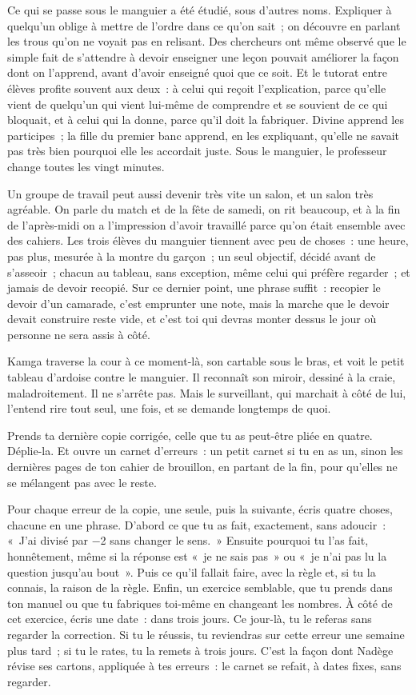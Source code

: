 \documentclass[10.5pt,twoside,openright]{book}
\newcommand{\soustitre}[1]{\par\vspace{1.1em}\noindent{\bfseries\color{accent}#1}\par\vspace{0.4em}\noindent}
\begin{document}
Ce qui se passe sous le manguier a été étudié, sous d’autres noms. Expliquer à quelqu’un oblige à mettre de l’ordre dans ce qu’on sait ; on découvre en parlant les trous qu’on ne voyait pas en relisant. Des chercheurs ont même observé que le simple fait de s’attendre à devoir enseigner une leçon pouvait améliorer la façon dont on l’apprend, avant d’avoir enseigné quoi que ce soit. Et le tutorat entre élèves profite souvent aux deux : à celui qui reçoit l’explication, parce qu’elle vient de quelqu’un qui vient lui-même de comprendre et se souvient de ce qui bloquait, et à celui qui la donne, parce qu’il doit la fabriquer. Divine apprend les participes ; la fille du premier banc apprend, en les expliquant, qu’elle ne savait pas très bien pourquoi elle les accordait juste. Sous le manguier, le professeur change toutes les vingt minutes.

Un groupe de travail peut aussi devenir très vite un salon, et un salon très agréable. On parle du match et de la fête de samedi, on rit beaucoup, et à la fin de l’après-midi on a l’impression d’avoir travaillé parce qu’on était ensemble avec des cahiers. Les trois élèves du manguier tiennent avec peu de choses : une heure, pas plus, mesurée à la montre du garçon ; un seul objectif, décidé avant de s’asseoir ; chacun au tableau, sans exception, même celui qui préfère regarder ; et jamais de devoir recopié. Sur ce dernier point, une phrase suffit : recopier le devoir d’un camarade, c’est emprunter une note, mais la marche que le devoir devait construire reste vide, et c’est toi qui devras monter dessus le jour où personne ne sera assis à côté.

Kamga traverse la cour à ce moment-là, son cartable sous le bras, et voit le petit tableau d’ardoise contre le manguier. Il reconnaît son miroir, dessiné à la craie, maladroitement. Il ne s’arrête pas. Mais le surveillant, qui marchait à côté de lui, l’entend rire tout seul, une fois, et se demande longtemps de quoi.

\soustitre{Ce soir, essaie ceci}

Prends ta dernière copie corrigée, celle que tu as peut-être pliée en quatre. Déplie-la. Et ouvre un carnet d’erreurs : un petit carnet si tu en as un, sinon les dernières pages de ton cahier de brouillon, en partant de la fin, pour qu’elles ne se mélangent pas avec le reste.

Pour chaque erreur de la copie, une seule, puis la suivante, écris quatre choses, chacune en une phrase. D’abord ce que tu as fait, exactement, sans adoucir : « J’ai divisé par −2 sans changer le sens. » Ensuite pourquoi tu l’as fait, honnêtement, même si la réponse est « je ne sais pas » ou « je n’ai pas lu la question jusqu’au bout ». Puis ce qu’il fallait faire, avec la règle et, si tu la connais, la raison de la règle. Enfin, un exercice semblable, que tu prends dans ton manuel ou que tu fabriques toi-même en changeant les nombres. À côté de cet exercice, écris une date : dans trois jours. Ce jour-là, tu le referas sans regarder la correction. Si tu le réussis, tu reviendras sur cette erreur une semaine plus tard ; si tu le rates, tu la remets à trois jours. C’est la façon dont Nadège révise ses cartons, appliquée à tes erreurs : le carnet se refait, à dates fixes, sans regarder.
\end{document}
